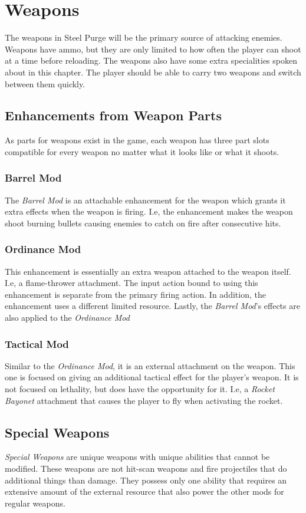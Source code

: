 \documentclass[../Main.tex]{subfiles}
\begin{document}
\section{Weapons}

The weapons in Steel Purge will be the primary source of attacking enemies. Weapons have ammo, but they are only limited to how often the player can shoot at a time before reloading. The weapons also have some extra specialities spoken about in this chapter. The player should be able to carry two weapons and switch between them quickly.

\subsection{Enhancements from Weapon Parts}

As parts for weapons exist in the game, each weapon has three part slots compatible for every weapon no matter what it looks like or what it shoots.

\subsubsection{Barrel Mod}

The \emph{Barrel Mod} is an attachable enhancement for the weapon which grants it extra effects when the weapon is firing. I.e, the enhancement makes the weapon shoot burning bullets causing enemies to catch on fire after consecutive hits. 

\subsubsection{Ordinance Mod}

This enhancement is essentially an extra weapon attached to the weapon itself. I.e, a flame-thrower attachment. The input action bound to using this enhancement is separate from the primary firing action. In addition, the enhancement uses a different limited resource. Lastly, the \emph{Barrel Mod}'s effects are also applied to the \emph{Ordinance Mod}

\subsubsection{Tactical Mod}

Similar to the \emph{Ordinance Mod}, it is an external attachment on the weapon. This one is focused on giving an additional tactical effect for the player's weapon. It is not focused on lethality, but does have the opportunity for it. I.e, a \emph{Rocket Bayonet} attachment that causes the player to fly when activating the rocket. 

\subsection{Special Weapons}

\emph{Special Weapons} are unique weapons with unique abilities that cannot be modified. These weapons are not hit-scan weapons and fire projectiles that do additional things than damage. They possess only one ability that requires an extensive amount of the external resource that also power the other mods for regular weapons. 
\end{document}
